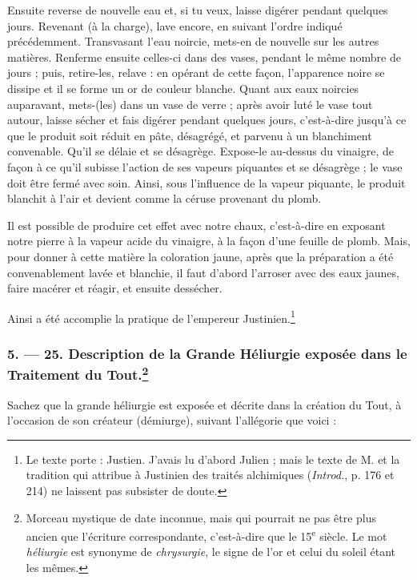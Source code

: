 \documentclass[a4paper, 11pt, oneside, polutonikogreek, french]{article}
\begin{document}
Ensuite reverse de nouvelle eau et, si tu veux, laisse digérer pendant quelques jours. Revenant (à la charge), lave encore, en suivant l'ordre indiqué précédemment. Transvasant l'eau noircie, mets-en de nouvelle sur les autres matières. Renferme ensuite celles-ci dans des vases, pendant le même nombre de jours ; puis, retire-les, relave : en opérant de cette façon, l'apparence noire se dissipe et il se forme un or de couleur blanche. Quant aux eaux noircies auparavant, mets-(les) dans un vase de verre ; après avoir luté le vase tout autour, laisse sécher et fais digérer pendant quelques jours, c'est-à-dire jusqu'à ce que le produit soit réduit en pâte, désagrégé, et parvenu à un blanchiment convenable. Qu'il se délaie et se désagrège. Expose-le au-dessus du vinaigre, de façon à ce qu'il subisse l'action de ses vapeurs piquantes et se désagrège ; le vase doit être fermé avec soin. Ainsi, sous l'influence de la vapeur piquante, le produit blanchit à l'air et devient comme la céruse provenant du plomb.

Il est possible de produire cet effet avec notre chaux, c'est-à-dire en exposant notre pierre à la vapeur acide du vinaigre, à la façon d'une feuille de plomb. Mais, pour donner à cette matière la coloration jaune, après que la préparation a été convenablement lavée et blanchie, il faut d'abord l'arroser avec des eaux jaunes, faire macérer et réagir, et ensuite dessécher.

Ainsi a été accomplie la pratique de l'empereur Justinien.\footnote{Le texte porte : Justien. J'avais lu d'abord Julien ; mais le texte de M. et la tradition qui attribue à Justinien des traités alchimiques (\emph{Introd.}, p. 176 et 214) ne laissent pas subsister de doute.}

\bigskip
\centerline{\EightStarTaper}
\centerline{\EightStarTaper\EightStarTaper}
\bigskip

\subsubsection[5. --- 25. Description de la Grande Héliurgie exposée dans le Traitement du Tout.]{5. --- 25. Description de la Grande Héliurgie exposée dans le Traitement du Tout.\footnote{Morceau mystique de date inconnue, mais qui pourrait ne pas être plus ancien que l'écriture correspondante, c'est-à-dire que le 15\textsuperscript{e} siècle. Le mot \emph{héliurgie} est synonyme de \emph{chrysurgie}, le signe de l'or et celui du soleil étant les mêmes.}}

Sachez que la grande héliurgie est exposée et décrite dans la création du Tout, à l'occasion de son créateur (démiurge), suivant l'allégorie que voici :
\end{document}
